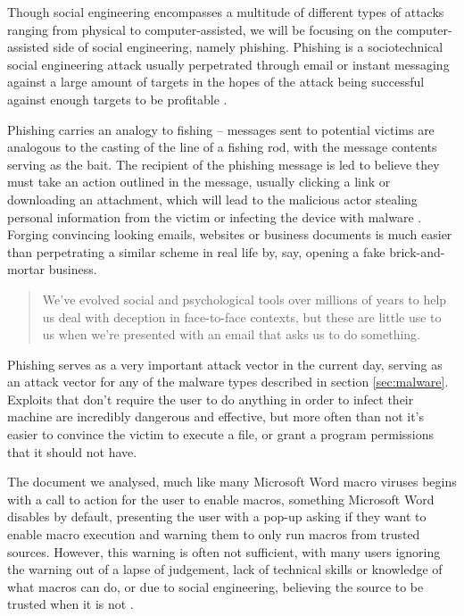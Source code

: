 Though social engineering encompasses a multitude of different types of attacks ranging from physical to
computer-assisted, we will be focusing on the computer-assisted side of social engineering, namely phishing.
Phishing is a sociotechnical social engineering attack usually perpetrated through email or instant messaging 
against a large amount of targets in the hopes of the attack being successful against enough targets to be 
profitable \cite{advanced-social-engineering-attacks}. 

Phishing carries an analogy to fishing -- messages sent to potential victims are analogous to the casting of 
the line of a fishing rod, with the message contents serving as the bait. 
The recipient of the phishing message is led to believe they must take an action outlined in the message,
usually clicking a link or downloading an attachment, which will lead to the malicious actor stealing
personal information from the victim or infecting the device with malware \cite{state-of-phishing}.
Forging convincing looking emails, websites or business documents is much easier than perpetrating a similar 
scheme in real life by, say, opening a fake brick-and-mortar business.
\begin{quote}
  We’ve evolved social and psychological tools over millions of years to help
  us deal with deception in face-to-face contexts, but these are little use to us
  when we’re presented with an email that asks us to do something. \cite{anderson-security-engineering}
\end{quote}

Phishing serves as a very important attack vector in the current day, serving as an attack vector for any of the malware
types described in section \ref{sec:malware}. Exploits that don't require the user to do anything in order to infect
their machine are incredibly dangerous and effective, but more often than not it's easier to convince the victim to
execute a file, or grant a program permissions that it should not have.

The document we analysed, much like many Microsoft Word macro viruses begins with a call to action for the user to
enable macros, something Microsoft Word disables by default, presenting the user with a pop-up asking if they want to
enable macro execution and warning them to only run macros from trusted sources. However, this warning is often not
sufficient, with many users ignoring the warning out of a lapse of judgement, lack of technical skills or knowledge of
what macros can do, or due to social engineering, believing the source to be trusted when it is not
\cite{macro-viruses-users}.

